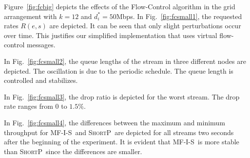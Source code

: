 \documentclass[12pt]{article}
\newenvironment{proof sketch}[1]{\noindent {\emph{Proof sketch of #1:}}}{\hfill \qed}
\newcommand{\algA}{\textsc{MF-I-S}}
\newcommand{\algB}{\textsc{ShortP}}
\newcommand{\algS}{\algB}
\begin{document}
Figure~\ref{fig:fcbig} depicts the effects of the Flow-Control
algorithm in the grid arrangement with $k=12$ and $d^*_i=50$Mbps.  In
Fig.~\ref{fig:fcsmall1}, the requested rates $R(e,s)$ are depicted. It
can be seen that only slight perturbations occur over time. This
justifies our simplified implementation that uses virtual flow-control messages.

In Fig.~\ref{fig:fcsmall2}, the queue lengths of the stream in three
different nodes are depicted.  The oscillation is due to the periodic
schedule. The queue length is controlled and stabilizes.

In Fig.~\ref{fig:fcsmall3}, the drop ratio is depicted for the worst
stream. The drop rate ranges from $0$ to $1.5$\%.

In Fig.~\ref{fig:fcsmall4}, the differences between the maximum and
minimum throughput for \algA\ and \algS\ are depicted for all streams
two seconds after the beginning of the experiment.
It is evident that \algA\ is more stable than \algS\ since the differences are smaller.

\end{document}
